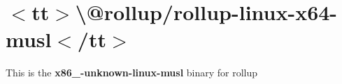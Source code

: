 \chapter{\texorpdfstring{$<$}{<}tt\texorpdfstring{$>$}{>}\textbackslash{}@rollup/rollup-\/linux-\/x64-\/musl\texorpdfstring{$<$}{<}/tt\texorpdfstring{$>$}{>}}
\hypertarget{md__2home_2solype_2delivery_2current__days_2Mannheim_2front_2node__modules_2_0drollup_2rollup-linux-x64-musl_2README}{}\label{md__2home_2solype_2delivery_2current__days_2Mannheim_2front_2node__modules_2_0drollup_2rollup-linux-x64-musl_2README}
\label{md__2home_2solype_2delivery_2current__days_2Mannheim_2front_2node__modules_2_0drollup_2rollup-linux-x64-musl_2README_autotoc_md691}%
%
 This is the {\bfseries{x86\+\_-\/unknown-\/linux-\/musl}} binary for {\ttfamily rollup} 